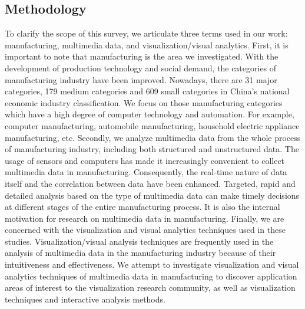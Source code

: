 \documentclass[a4paper,fleqn]{cas-dc}
\begin{document}
\subsection{Methodology}
To clarify the scope of this survey, we articulate three terms used in our work: manufacturing, multimedia data, and visualization/visual analytics.
First, it is important to note that manufacturing is the area we investigated.
With the development of production technology and social demand, the categories of manufacturing industry have been improved.
Nowadays, there are 31 major categories, 179 medium categories and 609 small categories in China's national economic industry classification.
We focus on those manufacturing categories which have a high degree of computer technology and automation.
For example, computer manufacturing, automobile manufacturing, household electric appliance manufacturing, etc.
Secondly, we analyze multimedia data from the whole process of manufacturing industry, including both structured and unstructured data. 
The usage of sensors and computers has made it increasingly convenient to collect multimedia data in manufacturing.
Consequently, the real-time nature of data itself and the correlation between data have been enhanced.
Targeted, rapid and detailed analysis based on the type of multimedia data can make timely decisions at different stages of the entire manufacturing process.
It is also the internal motivation for research on multimedia data in manufacturing.
Finally, we are concerned with the visualization and visual analytics techniques used in these studies.
Visualization/visual analysis techniques are frequently used in the analysis of multimedia data in the manufacturing industry because of their intuitiveness and effectiveness.
We attempt to investigate visualization and visual analytics techniques of multimedia data in manufacturing to discover application areas of interest to the visualization research community, as well as visualization techniques and interactive analysis methods.
\end{document}
